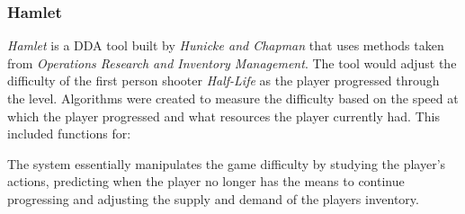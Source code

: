 \documentclass[journal]{IEEEtran}
\begin{document}
\subsubsection{Hamlet}
\textit{Hamlet} \cite{hunicke2005case} is a DDA tool built by \textit{Hunicke and Chapman} that uses methods taken from \textit{Operations Research and Inventory Management}. The tool would adjust the difficulty of the first person shooter \textit{Half-Life} \cite{game:halflife} as the player progressed through the level. Algorithms were created to measure the difficulty based on the speed at which the player progressed and what resources the player currently had. This included functions for:


The system essentially manipulates the game difficulty by studying the player's actions, predicting when the player no longer has the means to continue progressing and adjusting the supply and demand of the players inventory.
\end{document}
